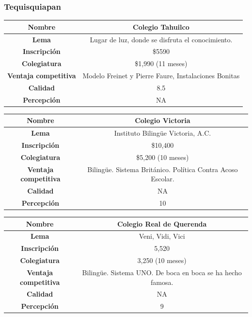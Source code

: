 \documentclass[10pt,letterpaper,oneside]{book}
\begin{document}
\subsubsection*{Tequisquiapan}
\begin{center}
\begin{tabular}{|c|c|}
\hline 
{\bf Nombre} & Colegio Tahuilco \\ 
\hline 
{\bf Lema} & Lugar de luz, donde se disfruta el conocimiento. \\ 
\hline 
{\bf Inscripción} & \$5590 \\ 
\hline 
{\bf Colegiatura} & \$1,990 (11 meses)\\  
\hline 
{\bf Ventaja competitiva} & Modelo Freinet y Pierre Faure, Instalaciones Bonitas \\ 
\hline 
{\bf Calidad} & 8.5 \\ 
\hline
{\bf Percepción} & NA \\ 
\hline 
\end{tabular} 
\end{center}

\begin{center}
\begin{tabular}{|c|c|}
\hline 
{\bf Nombre} & Colegio Victoria \\ 
\hline 
{\bf Lema} & Instituto Bilingüe Victoria, A.C. \\ 
\hline 
{\bf Inscripción} &  \$10,400\\ 
\hline 
{\bf Colegiatura} & \$5,200 (10 meses)\\ 
\hline
{\bf Ventaja competitiva} & Bilingüe. Sistema Británico. Política Contra Acoso Escolar. \\ 
\hline 
{\bf Calidad} & NA \\ 
\hline 
{\bf Percepción} & 10 \\ 
\hline 
\end{tabular} 
\end{center}

\begin{center}
\begin{tabular}{|c|c|}
\hline 
{\bf Nombre} & Colegio Real de Querenda \\ 
\hline 
{\bf Lema} & Veni, Vidi, Vici \\ 
\hline 
{\bf Inscripción} & 5,520 \\ 
\hline 
{\bf Colegiatura} & 3,250 (10 meses) \\
\hline
{\bf Ventaja competitiva} & Bilingüe. Sistema UNO. De boca en boca se ha hecho famosa. \\ 
\hline 
{\bf Calidad} & NA \\ 
\hline 
{\bf Percepción} & 9 \\ 
\hline 
\end{tabular} 
\end{center}
\end{document}
